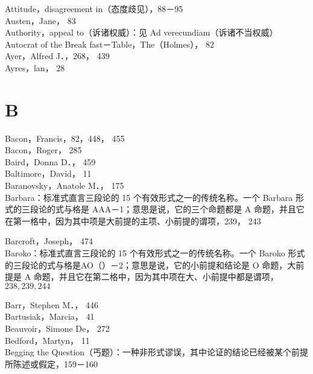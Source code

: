 Attitude，disagreement in（态度歧见），88－95\\
Austen，Jane， 83\\
Authority，appeal to（诉诸权威）：见 Ad verecundiam（诉诸不当权威）\\
Autocrat of the Break fast－Table，The（Holmes）， 82\\
Ayer，Alfred J．，268， 439\\
Ayres，lan， 28

\section*{B}
Bacon，Francis，82，448， 455\\
Bacon，Roger， 285\\
Baird，Donna D．， 459\\
Baltimore，David， 11\\
Baranovsky，Anatole M．， 175\\
Barbara：标准式直言三段论的 15 个有效形式之一的传统名称。一个 Barbara 形式的三段论的式与格是 AAA－1；意思是说，它的三个命题都是 A 命题，并且它在第一格中，因为其中项是大前提的主项、小前提的谓项，239， 243

Barcroft，Joseph， 474\\
Baroko：标准式直言三段论的 15 个有效形式之一的传统名称。一个 Baroko 形式的三段论的式与格是AO（）－2；意思是说，它的小前提和结论是 O 命题，大前提是 A 命题，并且它在第二格中，因为其中项在大、小前提中都是谓项， $238,239,244$

Barr，Stephen M．， 446\\
Bartusiak，Marcia， 41\\
Beauvoir，Simone De， 272\\
Bedford，Martyn， 11\\
Begging the Question（丐题）：一种非形式谬误，其中论证的结论已经被某个前提所陈述或假定，159－160

